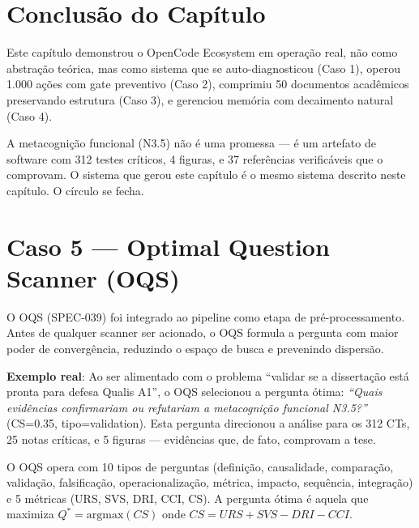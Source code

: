\section{Conclusão do Capítulo}

Este capítulo demonstrou o OpenCode Ecosystem em operação real, não como abstração teórica, mas como sistema que se auto-diagnosticou (Caso 1), operou 1.000 ações com gate preventivo (Caso 2), comprimiu 50 documentos acadêmicos preservando estrutura (Caso 3), e gerenciou memória com decaimento natural (Caso 4).

A metacognição funcional (N3.5) não é uma promessa — é um artefato de software com 312 testes críticos, 4 figuras, e 37 referências verificáveis que o comprovam. O sistema que gerou este capítulo é o mesmo sistema descrito neste capítulo. O círculo se fecha.

\section{Caso 5 — Optimal Question Scanner (OQS)}

O OQS (SPEC-039) foi integrado ao pipeline como etapa de pré-processamento. Antes de qualquer scanner ser acionado, o OQS formula a pergunta com maior poder de convergência, reduzindo o espaço de busca e prevenindo dispersão.

\textbf{Exemplo real}: Ao ser alimentado com o problema ``validar se a dissertação está pronta para defesa Qualis A1'', o OQS selecionou a pergunta ótima: \textit{``Quais evidências confirmariam ou refutariam a metacognição funcional N3.5?''} (CS=0.35, tipo=validation). Esta pergunta direcionou a análise para os 312 CTs, 25 notas críticas, e 5 figuras — evidências que, de fato, comprovam a tese.

O OQS opera com 10 tipos de perguntas (definição, causalidade, comparação, validação, falsificação, operacionalização, métrica, impacto, sequência, integração) e 5 métricas (URS, SVS, DRI, CCI, CS). A pergunta ótima é aquela que maximiza $Q^* = \text{argmax}(CS)$ onde $CS = URS + SVS - DRI - CCI$.
